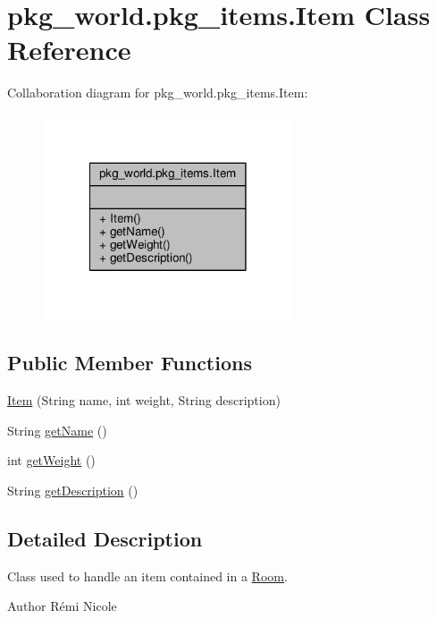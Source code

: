 \hypertarget{classpkg__world_1_1pkg__items_1_1Item}{\section{pkg\-\_\-world.\-pkg\-\_\-items.\-Item Class Reference}
\label{classpkg__world_1_1pkg__items_1_1Item}
}


Collaboration diagram for pkg\-\_\-world.\-pkg\-\_\-items.\-Item\-:
\nopagebreak
\begin{figure}[H]
\begin{center}
\leavevmode
\includegraphics[width=210pt]{classpkg__world_1_1pkg__items_1_1Item__coll__graph}
\end{center}
\end{figure}
\subsection*{Public Member Functions}
\begin{DoxyCompactItemize}
\item 
\hyperlink{classpkg__world_1_1pkg__items_1_1Item_a7ece2bd85f9e388cb9c2813f0b5ecc4e}{Item} (String name, int weight, String description)
\item 
String \hyperlink{classpkg__world_1_1pkg__items_1_1Item_ab541df9aad01409656af1aadfa66987a}{get\-Name} ()
\item 
int \hyperlink{classpkg__world_1_1pkg__items_1_1Item_afd46034ba99392bbe4a4432150c870d4}{get\-Weight} ()
\item 
String \hyperlink{classpkg__world_1_1pkg__items_1_1Item_ac2f68a92afd7e089cc4b955c37a63417}{get\-Description} ()
\end{DoxyCompactItemize}


\subsection{Detailed Description}
Class used to handle an item contained in a \hyperlink{classpkg__world_1_1Room}{Room}. \begin{DoxyAuthor}{Author}
Rémi Nicole 
\end{DoxyAuthor}


